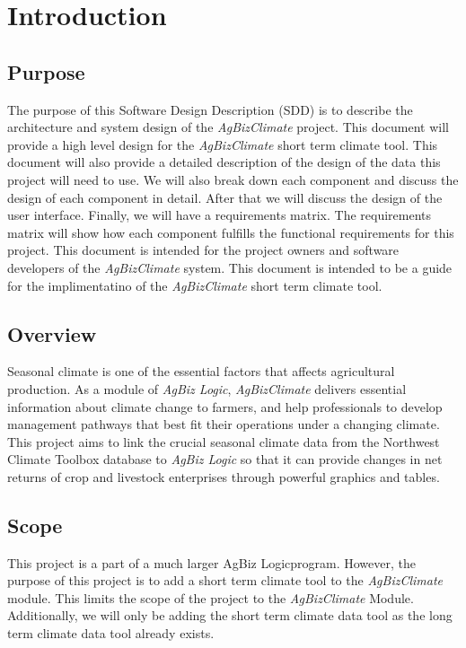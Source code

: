 \documentclass[onecolumn, draftclsnofoot,10pt, compsoc]{article}
\begin{document}
\section{Introduction}
		
		\subsection{Purpose}
			The purpose of this Software Design Description (SDD) is to describe the architecture and system design of the \textit{AgBizClimate} project. This document will provide a high level design for the \textit{AgBizClimate} short term climate tool. This document will also provide a detailed description of the design of the data this project will need to use. We will also break down each component and discuss the design of each component in detail. After that we will discuss the design of the user interface. Finally, we will have a requirements matrix. The requirements matrix will show how each component fulfills the functional requirements for this project. 
			This document is intended for the project owners and software developers of the \textit{AgBizClimate} system. This document is intended to be a guide for the implimentatino of the \textit{AgBizClimate} short term climate tool.
		
		\subsection{Overview}
			Seasonal climate is one of the essential factors that affects agricultural production. As a module of \textit{AgBiz Logic}, \textit{AgBizClimate} delivers essential information about climate change to farmers, and help professionals to develop management pathways that best fit their operations under a changing climate. This project aims to link the crucial seasonal climate data from the Northwest Climate Toolbox database to \textit{AgBiz Logic} so that it can provide changes in net returns of crop and livestock enterprises through powerful graphics and tables.\\
			
		\subsection{Scope}
			This project is a part of a much larger AgBiz Logic\texttrademark program. However, the purpose of this project is to add a short term climate tool to the \textit{AgBizClimate} module. This limits the scope of the project to the \textit{AgBizClimate} Module. Additionally, we will only be adding the short term climate data tool as the long term climate data tool already exists.\\			
\end{document}
